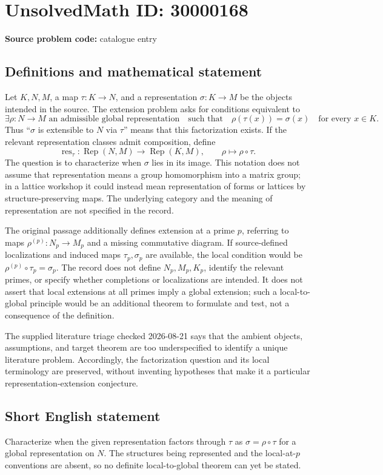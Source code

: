 \documentclass[11pt]{article}
\begin{document}
\section*{UnsolvedMath ID: 30000168}
\textbf{Source problem code:} catalogue entry
\subsection{Definitions and mathematical statement}
Let \(K,N,M\), a map \(\tau:K\to N\), and a representation \(\sigma:K\to M\) be the objects intended in the source. The extension problem asks for conditions equivalent to
\[
\exists\rho:N\to M\text{ an admissible global representation}
\quad\text{such that}\quad
\rho(\tau(x))=\sigma(x)\quad\text{for every }x\in K.
\]
Thus ``\(\sigma\) is extensible to \(N\) via \(\tau\)'' means that this factorization exists. If the relevant representation classes admit composition, define
\[
\operatorname{res}_{\tau}:\operatorname{Rep}(N,M)\longrightarrow\operatorname{Rep}(K,M),
\qquad\rho\longmapsto\rho\circ\tau.
\]
The question is to characterize when \(\sigma\) lies in its image. This notation does not assume that representation means a group homomorphism into a matrix group; in a lattice workshop it could instead mean representation of forms or lattices by structure-preserving maps. The underlying category and the meaning of representation are not specified in the record.

The original passage additionally defines extension at a prime \(p\), referring to maps \(\rho^{(p)}:N_p\to M_p\) and a missing commutative diagram. If source-defined localizations and induced maps \(\tau_p,\sigma_p\) are available, the local condition would be \(\rho^{(p)}\circ\tau_p=\sigma_p\). The record does not define \(N_p,M_p,K_p\), identify the relevant primes, or specify whether completions or localizations are intended. It does not assert that local extensions at all primes imply a global extension; such a local-to-global principle would be an additional theorem to formulate and test, not a consequence of the definition.

The supplied literature triage checked 2026-08-21 says that the ambient objects, assumptions, and target theorem are too underspecified to identify a unique literature problem. Accordingly, the factorization question and its local terminology are preserved, without inventing hypotheses that make it a particular representation-extension conjecture.
\subsection{Short English statement}
Characterize when the given representation factors through \(\tau\) as \(\sigma=\rho\circ\tau\) for a global representation on \(N\). The structures being represented and the local-at-\(p\) conventions are absent, so no definite local-to-global theorem can yet be stated.
\end{document}
